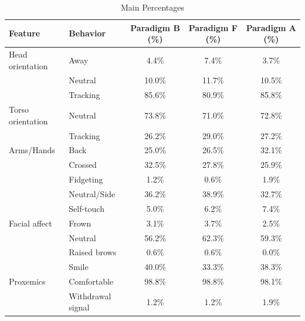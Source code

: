 \begin{table}[ht]
\centering
\caption{Main Percentages}
\label{tab:main_pct}
\begin{tabular}{llccc}
\toprule
Feature & Behavior & Paradigm B (\%) & Paradigm F (\%) & Paradigm A (\%) \\
\midrule
Head orientation & Away & 4.4\% & 7.4\% & 3.7\% \\
 & Neutral & 10.0\% & 11.7\% & 10.5\% \\
 & Tracking & 85.6\% & 80.9\% & 85.8\% \\
\midrule
Torso orientation & Neutral & 73.8\% & 71.0\% & 72.8\% \\
 & Tracking & 26.2\% & 29.0\% & 27.2\% \\
\midrule
Arms/Hands & Back & 25.0\% & 26.5\% & 32.1\% \\
 & Crossed & 32.5\% & 27.8\% & 25.9\% \\
 & Fidgeting & 1.2\% & 0.6\% & 1.9\% \\
 & Neutral/Side & 36.2\% & 38.9\% & 32.7\% \\
 & Self-touch & 5.0\% & 6.2\% & 7.4\% \\
\midrule
Facial affect & Frown & 3.1\% & 3.7\% & 2.5\% \\
 & Neutral & 56.2\% & 62.3\% & 59.3\% \\
 & Raised brows & 0.6\% & 0.6\% & 0.0\% \\
 & Smile & 40.0\% & 33.3\% & 38.3\% \\
\midrule
Proxemics & Comfortable & 98.8\% & 98.8\% & 98.1\% \\
 & Withdrawal signal & 1.2\% & 1.2\% & 1.9\% \\
\midrule
\bottomrule
\end{tabular}
\end{table}
